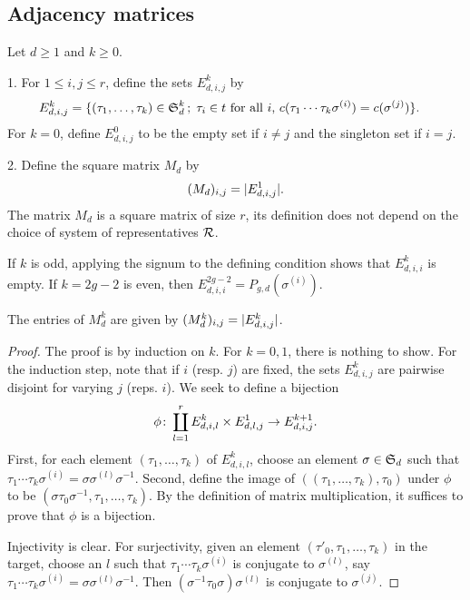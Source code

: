 \subsection{Adjacency matrices}

\begin{defi}
 Let $d\geq 1$ and $k\geq 0$.
 
  1. For $1\leq i,j\leq r$, define the sets $E_{d,i,j}^k$ by
  \begin{align*}
   E_{d,i,j}^k = \{(\tau_1,\dotsc,\tau_k)\in \operatorname{\mathfrak{S}}_d^{k} \,;\; \tau_i\in t \text{ for all $i$, } &c(\tau_1\dotsm\tau_k\sigma^{(i)})= c(\sigma^{(j)})\}.
  \end{align*}
  For $k=0$, define $E_{d,i,j}^0$ to be the empty set if $i\neq j$ and the singleton set if $i=j$.
  
  2. Define the square matrix $M_d$ by
  \[
   (M_d)_{i,j}=|E_{d,i,j}^1|.
  \]
  The matrix $M_d$ is a square matrix of size $r$, its definition does not depend on the choice of system of representatives $\mathcal{R}$.
\end{defi}

\begin{rmk}
 If $k$ is odd, applying the signum to the defining condition shows that $E_{d,i,i}^k$ is empty. If $k=2g-2$ is even, then $E_{d,i,i}^{2g-2}=P_{g,d}(\sigma^{(i)})$.
\end{rmk}

\begin{prop}
 The entries of $M_d^k$ are given by $(M_d^k)_{i,j}=|E_{d,i,j}^k|$.
\end{prop}
\begin{proof}
 The proof is by induction on $k$. For $k=0,1$, there is nothing to show. For the induction step, note that if $i$ (resp. $j$) are fixed, the sets $E_{d,i,j}^k$ are pairwise disjoint for varying $j$ (reps. $i$). We seek to define a bijection
 \[
  \phi\colon\coprod_{l=1}^r E_{d,i,l}^k \times E_{d,l,j}^1 \to E_{d,i,j}^{k+1}.
 \]
 First, for each element $(\tau_1,\dotsc,\tau_k)$ of $E_{d,i,l}^k$, choose an element $\sigma\in\operatorname{\mathfrak{S}}_d$ such that $\tau_1\dotsm\tau_k\sigma^{(i)}=\sigma\sigma^{(l)}\sigma^{-1}$. Second, define the image of $((\tau_1,\dotsc,\tau_k),\tau_0)$ under $\phi$ to be $(\sigma\tau_0\sigma^{-1},\tau_1,\dotsc,\tau_k)$. By the definition of matrix multiplication, it suffices to prove that $\phi$ is a bijection.
 
 Injectivity is clear. For surjectivity, given an element $(\tau'_0,\tau_1,\dotsc,\tau_k)$ in the target, choose an $l$ such that $\tau_1\dotsm\tau_k\sigma^{(i)}$ is conjugate to $\sigma^{(l)}$, say $\tau_1\dotsm\tau_k\sigma^{(i)}=\sigma\sigma^{(l)}\sigma^{-1}$. Then $(\sigma^{-1}\tau_0\sigma)\sigma^{(l)}$ is conjugate to $\sigma^{(j)}$.
\end{proof}

